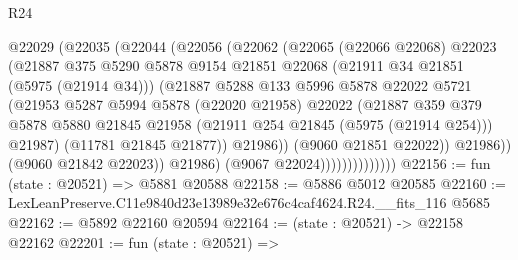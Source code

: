 \begin{lexlean}{R24}
\begin{coremodule}
                            @22029
                              (@22035
                                (@22044
                                  (@22056
                                    (@22062
                                      (@22065
                                        (@22066 @22068)
                                        @22023
                                        (@21887
                                          @375
                                          @5290
                                          @5878
                                          @9154
                                          @21851
                                          @22068
                                          (@21911 @34 @21851 (@5975 (@21914 @34)))
                                          (@21887
                                            @5288
                                            @133
                                            @5996
                                            @5878
                                            @22022
                                            @5721
                                            (@21953
                                              @5287
                                              @5994
                                              @5878
                                              (@22020 @21958)
                                              @22022
                                              (@21887
                                                @359
                                                @379
                                                @5878
                                                @5880
                                                @21845
                                                @21958
                                                (@21911 @254 @21845 (@5975 (@21914 @254)))
                                                @21987)
                                              (@11781 @21845 @21877))
                                            @21986))
                                        (@9060 @21851 @22022))
                                      @21986))
                                  (@9060 @21842 @22023))
                                @21986)
                              (@9067 @22024))))))))))))))
@22156 := fun (state : @20521) => @5881 @20588
@22158 := @5886 @5012 @20585
@22160 := LexLeanPreserve.C11e9840d23e13989e32e676c4caf4624.R24.__fits_116 @5685
@22162 := @5892 @22160 @20594
@22164 := (state : @20521) -> @22158 @22162
@22201 := fun (state : @20521) =>

\end{coremodule}
\end{lexlean}
